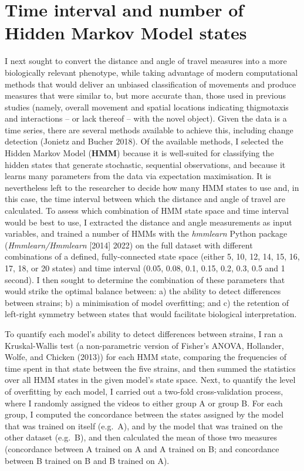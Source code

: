 \documentclass[
]{book}
\begin{document}
\hypertarget{pilot-hmm-params}{%
\section{Time interval and number of Hidden Markov Model states}\label{pilot-hmm-params}}

I next sought to convert the distance and angle of travel measures into a more biologically relevant phenotype, while taking advantage of modern computational methods that would deliver an unbiased classification of movements and produce measures that were similar to, but more accurate than, those used in previous studies (namely, overall movement and spatial locations indicating thigmotaxis and interactions -- or lack thereof -- with the novel object). Given the data is a time series, there are several methods available to achieve this, including change detection (Jonietz and Bucher 2018). Of the available methods, I selected the Hidden Markov Model (\textbf{HMM}) because it is well-suited for classifying the hidden states that generate stochastic, sequential observations, and because it learns many parameters from the data via expectation maximisation. It is nevertheless left to the researcher to decide how many HMM states to use and, in this case, the time interval between which the distance and angle of travel are calculated. To assess which combination of HMM state space and time interval would be best to use, I extracted the distance and angle measurements as input variables, and trained a number of HMMs with the \emph{hmmlearn} Python package (\emph{Hmmlearn/Hmmlearn} {[}2014{]} 2022) on the full dataset with different combinations of a defined, fully-connected state space (either 5, 10, 12, 14, 15, 16, 17, 18, or 20 states) and time interval (0.05, 0.08, 0.1, 0.15, 0.2, 0.3, 0.5 and 1 second). I then sought to determine the combination of these parameters that would strike the optimal balance between: a) the ability to detect differences between strains; b) a minimisation of model overfitting; and c) the retention of left-right symmetry between states that would facilitate biological interpretation.

To quantify each model's ability to detect differences between strains, I ran a Kruskal-Wallis test (a non-parametric version of Fisher's ANOVA, Hollander, Wolfe, and Chicken (2013)) for each HMM state, comparing the frequencies of time spent in that state between the five strains, and then summed the statistics over all HMM states in the given model's state space. Next, to quantify the level of overfitting by each model, I carried out a two-fold cross-validation process, where I randomly assigned the videos to either group A or group B. For each group, I computed the concordance between the states assigned by the model that was trained on itself (e.g.~A), and by the model that was trained on the other dataset (e.g.~B), and then calculated the mean of those two measures (concordance between A trained on A and A trained on B; and concordance between B trained on B and B trained on A).
\end{document}
